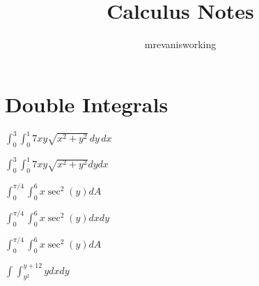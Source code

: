 \documentclass[12pt]{article}%
\begin{document}
\title{Calculus Notes}
\author{mrevanisworking}

\section{Double Integrals}
$ \int_{0}^{3} \int_{0}^{1} 7xy \sqrt{x^2+y^2}\,dy\,dx $ 
                                                            
 $ \int_{0}^{3} \int_{0}^{1} 7xy \sqrt{x^2+y^2} dydx$  
 \par $ \int_{0}^{\pi/4} \int_{0}^{6} x \sec^2(y)dA$  
 \par $ \int_{0}^{\pi/4} \int_{0}^{6} x \sec^2(y)dxdy$  
 \par $ \int_{0}^{\pi/4} \int_{0}^{6} x \sec^2(y)dA$  
\par $ \int_{}^{} \int_{y^2}^{y+12} ydxdy$ 
\end{document}
